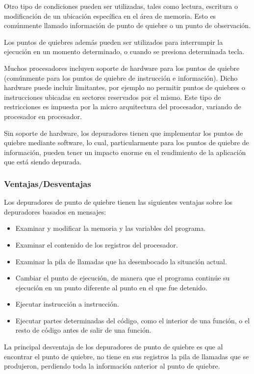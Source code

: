 \documentclass[12pt,legalpaper]{report}
\begin{document}
Otro tipo de condiciones pueden ser utilizadas, tales como lectura, escritura o modificación de un ubicación específica en el área de memoria.  Esto es comúnmente llamado información de punto de quiebre o un punto de observación.

Los puntos de quiebres además pueden ser utilizados para interrumpir la ejecución en un momento determinado, o cuando se presiona determinada tecla.

Muchos procesadores incluyen soporte de hardware para los puntos de quiebre (comúnmente para los puntos de quiebre de instrucción e información).  Dicho hardware puede incluir limitantes, por ejemplo no permitir puntos de quiebres o instrucciones ubicadas en sectores reservados por el mismo.  Este tipo de restricciones es impuesta por la micro arquitectura del procesador, variando de procesador en procesador.

Sin soporte de hardware, los depuradores tienen que implementar los puntos de quiebre mediante software, lo cual, particularmente para los puntos de quiebre de información, pueden tener un impacto enorme en el rendimiento de la aplicación que está siendo depurada.


			\subsubsection{Ventajas/Desventajas}
			
Los depuradores de punto de quiebre tienen las siguientes ventajas sobre los depuradores basados en mensajes:

\begin{itemize} 
	\item Examinar y modificar la memoria y las variables del programa.
	\item Examinar el contenido de los registros del procesador.
	\item Examinar la pila de llamadas que ha desembocado la situación actual.
	\item Cambiar el punto de ejecución, de manera que el programa continúe su ejecución en un punto diferente al punto en el que fue detenido.
	\item Ejecutar instrucción a instrucción.
	\item Ejecutar partes determinadas del código, como el interior de una función, o el resto de código antes de salir de una función.
\end{itemize}

La principal desventaja de los depuradores de punto de quiebre es que al encontrar el punto de quiebre, no tiene en sus registros la pila de llamadas que se produjeron, perdiendo toda la información anterior al punto de quiebre.
\end{document}
